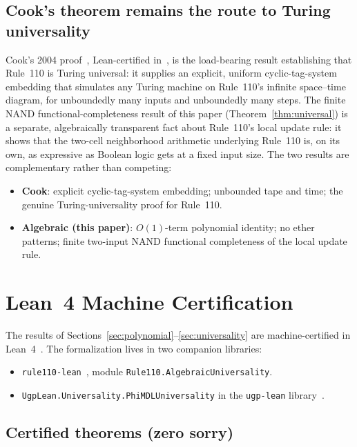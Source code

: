 \documentclass[11pt]{article}
\theoremstyle{remark}
\newcommand{\lean}[1]{%
  \penalty-100
  \begingroup\def\_{\textunderscore\allowbreak}\texttt{#1}\endgroup}
\begin{document}
\subsection{Cook's theorem remains the route to Turing universality}

Cook's 2004 proof~\cite{Cook2004}, Lean-certified in~\cite{SpivackCookTheorem,rule110-lean},
is the load-bearing result establishing that Rule~110 is Turing universal: it
supplies an explicit, uniform cyclic-tag-system embedding that simulates any Turing
machine on Rule~110's infinite space--time diagram, for unboundedly many inputs and
unboundedly many steps.
The finite NAND functional-completeness result of this paper (Theorem~\ref{thm:universal})
is a separate, algebraically transparent fact about Rule~110's local update rule: it
shows that the two-cell neighborhood arithmetic underlying Rule~110 is, on its own,
as expressive as Boolean logic gets at a fixed input size.
The two results are complementary rather than competing:
\begin{itemize}[itemsep=0.1em]
  \item \textbf{Cook}: explicit cyclic-tag-system embedding; unbounded tape and time;
        the genuine Turing-universality proof for Rule~110.
  \item \textbf{Algebraic (this paper)}: $O(1)$-term polynomial identity; no ether
        patterns; finite two-input NAND functional completeness of the local update rule.
\end{itemize}

\section{Lean~4 Machine Certification}
\label{sec:lean}

The results of Sections~\ref{sec:polynomial}--\ref{sec:universality} are
machine-certified in Lean~4~\cite{deMoura2021Lean}.
The formalization lives in two companion libraries:
\begin{itemize}[itemsep=0.1em]
  \item \texttt{rule110-lean}~\cite{rule110-lean}, module \lean{Rule110.AlgebraicUniversality}.
  \item \lean{UgpLean.Universality.PhiMDLUniversality} in the \texttt{ugp-lean}
        library~\cite{SpivackUGPFormalization}.
\end{itemize}

\subsection{Certified theorems (zero sorry)}
\end{document}
